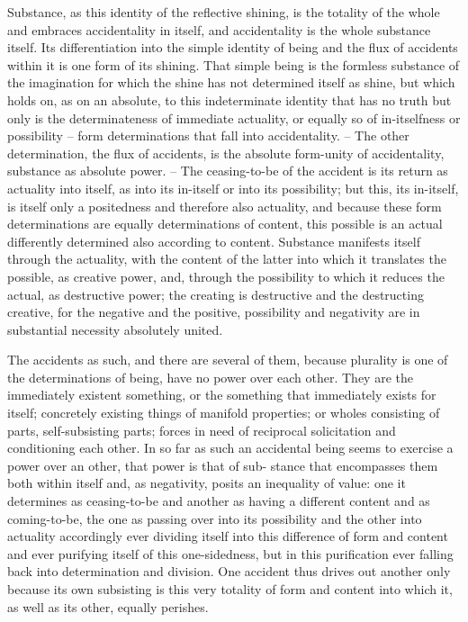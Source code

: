 Substance, as this identity of the reflective shining, is the totality of the
whole and embraces accidentality in itself, and accidentality is the whole
substance itself. Its differentiation into the simple identity of being and the
flux of accidents within it is one form of its shining. That simple being
is the formless substance of the imagination for which the shine has not
determined itself as shine, but which holds on, as on an absolute, to this
indeterminate identity that has no truth but only is the determinateness
of immediate actuality, or equally so of in-itselfness or possibility – form
determinations that fall into accidentality. –
The other determination, the flux of accidents, is the absolute form-unity
of accidentality, substance as absolute power. – The ceasing-to-be of the
accident is its return as actuality into itself, as into its in-itself or into its
possibility; but this, its in-itself, is itself only a positedness and therefore also
actuality, and because these form determinations are equally determinations
of content, this possible is an actual differently determined also according to
content. Substance manifests itself through the actuality, with the content
of the latter into which it translates the possible, as creative power, and,
through the possibility to which it reduces the actual, as destructive power;
the creating is destructive and the destructing creative, for the negative and
the positive, possibility and negativity are in substantial necessity absolutely
united.

The accidents as such, and there are several of them,
because plurality is one of the determinations of being,
have no power over each other.
They are the immediately existent something,
or the something that immediately exists for itself;
concretely existing things of manifold properties;
or wholes consisting of parts, self-subsisting parts;
forces in need of reciprocal solicitation and conditioning each other.
In so far as such an accidental
being seems to exercise a power over an other, that power is that of sub-
stance that encompasses them both within itself and, as negativity, posits
an inequality of value:
one it determines as ceasing-to-be
and another as having a different content
and as coming-to-be,
the one as passing over into its possibility
and the other into actuality
accordingly ever dividing itself
into this difference of form and content
and ever purifying itself of this one-sidedness,
but in this purification ever falling back
into determination and division.
One accident thus drives out another
only because its own subsisting is
this very totality of form and content
into which it, as well as its other, equally perishes.

